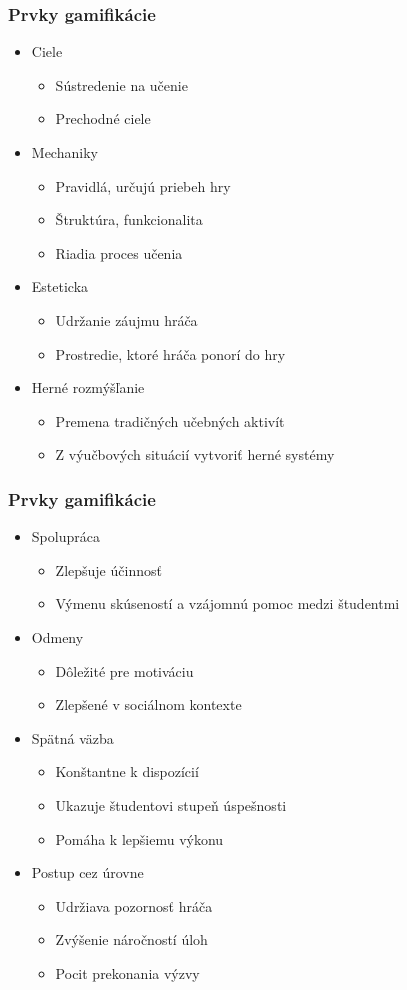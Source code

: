 \documentclass{beamer}
\begin{document}
\begin{frame}[fragile=singleslide,plain]\frametitle{Prvky gamifikácie}
\begin{itemize}
\item Ciele
	\begin{itemize}
	\item Sústredenie na učenie
	\item Prechodné ciele
	\end{itemize}
\item Mechaniky
	\begin{itemize}
	\item Pravidlá, určujú priebeh hry
	\item Štruktúra, funkcionalita
	\item Riadia proces učenia
	\end{itemize}
\item Esteticka
	\begin{itemize}
	\item Udržanie záujmu hráča
	\item Prostredie, ktoré hráča ponorí do hry
	\end{itemize}
\item Herné rozmýšľanie
	\begin{itemize}
	\item Premena tradičných učebných aktivít
	\item Z výučbových situácií vytvoriť herné systémy
	\end{itemize}
\end{itemize}
\end{frame}
\begin{frame}[fragile=singleslide,plain]\frametitle{Prvky gamifikácie}
\begin{itemize}
\item Spolupráca
	\begin{itemize}
	\item Zlepšuje účinnosť
	\item Výmenu skúseností a vzájomnú pomoc medzi študentmi
	\end{itemize}
\item Odmeny
	\begin{itemize}
	\item Dôležité pre motiváciu
	\item Zlepšené v sociálnom kontexte
	\end{itemize}
\item Spätná väzba
	\begin{itemize}
	\item Konštantne k dispozícií
	\item Ukazuje študentovi stupeň úspešnosti
	\item Pomáha k lepšiemu výkonu
	\end{itemize}
\item Postup cez úrovne
	\begin{itemize}
	\item Udržiava pozornosť hráča
	\item Zvýšenie náročností úloh
	\item Pocit prekonania výzvy
	\end{itemize}
\end{itemize}
\end{frame}
\end{document}
